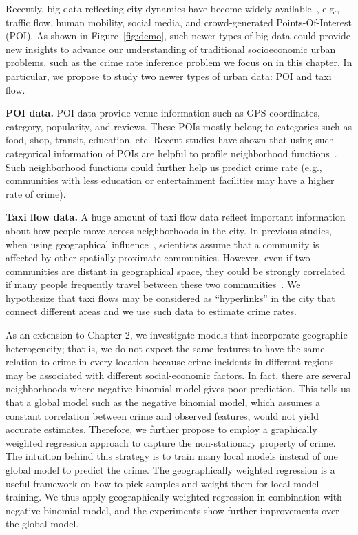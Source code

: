 Recently, big data reflecting city dynamics have become widely available~\cite{ZCWY14}, e.g., traffic flow, human mobility, social media, and crowd-generated Points-Of-Interest (POI). As shown in Figure~\ref{fig:demo}, such newer types of big data could provide new insights to advance our understanding of traditional socioeconomic urban problems, such as the crime rate inference problem we focus on in this chapter. In particular, we propose to study two newer types of urban data: POI and taxi flow. 

\textbf{POI data.} POI data provide venue information such as GPS coordinates, category, popularity, and reviews. These POIs mostly belong to categories such as food, shop, transit, education, etc. Recent studies have shown that using such categorical information of POIs are helpful to profile neighborhood functions~\cite{YZX12}. Such neighborhood functions could further help us predict crime rate (e.g., communities with less education or entertainment facilities may have a higher rate of crime).

\textbf{Taxi flow data.} A huge amount of taxi flow data reflect important information about how people move across neighborhoods in the city. In previous studies, when using geographical influence~\cite{Ans02}, scientists assume that a community is affected by other spatially proximate communities. However, even if two communities are distant in geographical space, they could be strongly correlated if many people frequently travel between these two communities~\cite{GGM14}. We hypothesize that taxi flows may be considered as ``hyperlinks'' in the city that connect different areas and we use such data to estimate crime rates. 



As an extension to Chapter 2, we investigate models that incorporate geographic heterogeneity; that is, we do not expect the same features to have the same relation to crime in every location because crime incidents in different regions may be associated with different social-economic factors.
In fact, there are several neighborhoods where negative binomial model gives poor prediction. This tells us that a global model such as the negative binomial model, which assumes a constant correlation between crime and observed features, would not yield accurate estimates. Therefore, we further propose to employ a graphically weighted regression approach to capture the non-stationary property of crime. The intuition behind this strategy is to train many local models instead of one global model to predict the crime. The geographically weighted regression is a useful framework on how to pick samples and weight them for local model training. We thus apply geographically weighted regression in combination with negative binomial model, and the experiments show further improvements over the global model.


